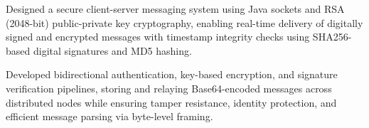 \vspace{4pt}
\begin{tightemize}
    \item Designed a secure client-server messaging system using Java sockets and RSA (2048-bit) public-private key cryptography, enabling real-time delivery of digitally signed and encrypted messages with timestamp integrity checks using SHA256-based digital signatures and MD5 hashing.
    \item Developed bidirectional authentication, key-based encryption, and signature verification pipelines, storing and relaying Base64-encoded messages across distributed nodes while ensuring tamper resistance, identity protection, and efficient message parsing via byte-level framing.
\end{tightemize}
